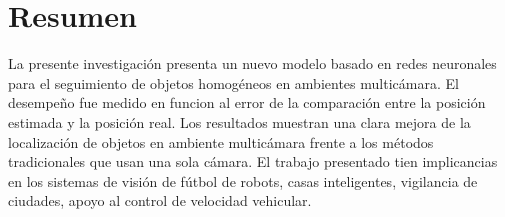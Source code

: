 
\chapter*{Resumen}
La presente investigaci\'on presenta un nuevo modelo basado en redes neuronales  para el seguimiento de objetos homog\'eneos en ambientes multic\'amara. El desempe\~no fue medido en funcion al error de la comparaci\'on entre la posici\'on estimada y la posici\'on real. Los resultados muestran una clara mejora de la localizaci\'on de objetos en ambiente multic\'amara frente a los m\'etodos tradicionales que usan una sola c\'amara. El trabajo presentado tien implicancias en los sistemas de visi\'on de f\'utbol de robots, casas inteligentes, vigilancia de ciudades, apoyo al control de velocidad vehicular.
